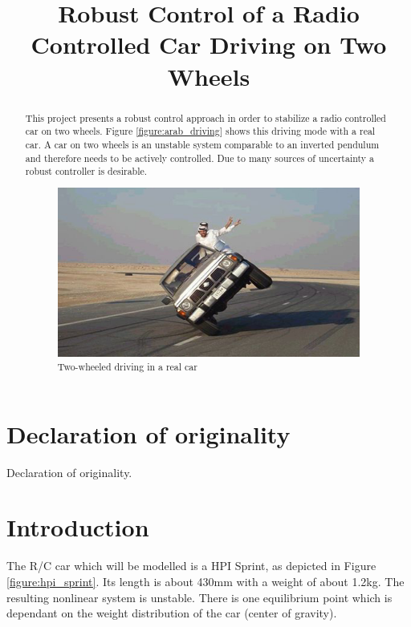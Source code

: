 \documentclass[conference]{IEEEtran}
\begin{document}
\title{Robust Control of a Radio Controlled Car Driving on Two Wheels }


\author{
}

\maketitle

\begin{abstract}

This project presents a robust control approach in order to stabilize a radio controlled car on two wheels. Figure \ref{figure:arab_driving} shows this driving mode with a real car. A car on two wheels is an unstable system comparable to an inverted pendulum and therefore needs to be actively controlled. Due to many sources of uncertainty a robust controller is desirable.

\begin{figure}[h]
\centering
  \includegraphics[width=.47\textwidth]{pics/drivesensibly.png} 
  \caption{Two-wheeled driving in a real car}  
  \label{figure:arab_driving}
\end{figure}

\end{abstract}

\section{Declaration of originality}

Declaration of originality.

\section{Introduction}

The R/C car which will be modelled is a HPI Sprint, as depicted in Figure \ref{figure:hpi_sprint}. Its length is about 430mm with a weight of about 1.2kg. The resulting nonlinear system is unstable. There is one equilibrium point which is dependant on the weight distribution of the car (center of gravity).
\end{document}

